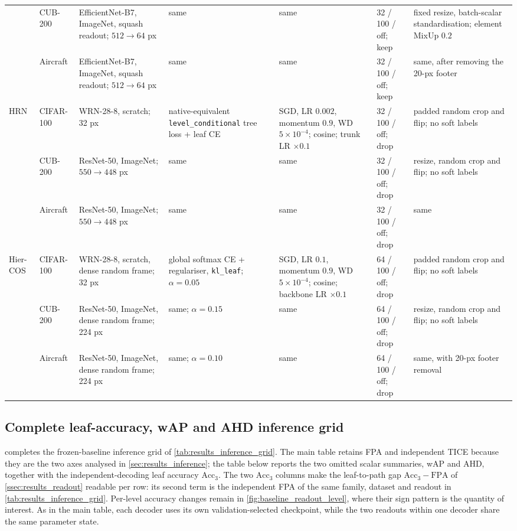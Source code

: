 \begin{table}[p]
\begin{tabularx}{\linewidth}{@{}L{1.15cm}L{1.35cm}L{2.35cm}L{2.65cm}L{2.85cm}L{1.55cm}Y@{}}
& CUB-200 & EfficientNet-B7, ImageNet, squash readout; $512\to64$ px & same & same & 32 /
100 / off; keep & fixed resize, batch-scalar standardisation; element MixUp
$0.2$ \\
& Aircraft & EfficientNet-B7, ImageNet, squash readout; $512\to64$ px & same & same & 32 /
100 / off; keep & same, after removing the 20-px footer \\
\midrule
HRN & CIFAR-100 & WRN-28-8, scratch; 32 px & native-equivalent
\texttt{level\_conditional} tree loss + leaf CE & SGD, LR $0.002$, momentum
$0.9$, WD $5\!\times\!10^{-4}$; cosine; trunk LR $\times0.1$ & 32 / 100 /
off; drop & padded random crop and flip; no soft labels \\
& CUB-200 & ResNet-50, ImageNet; $550\to448$ px & same & same & 32 / 100 /
off; drop & resize, random crop and flip; no soft labels \\
& Aircraft & ResNet-50, ImageNet; $550\to448$ px & same & same & 32 / 100 /
off; drop & same \\
\midrule
Hier-COS & CIFAR-100 & WRN-28-8, scratch, dense random frame; 32 px & global
softmax CE + regulariser, \texttt{kl\_leaf}; $\alpha=0.05$ & SGD, LR $0.1$,
momentum $0.9$, WD $5\!\times\!10^{-4}$; cosine; backbone LR $\times0.1$ &
64 / 100 / off; drop & padded random crop and flip; no soft labels \\
& CUB-200 & ResNet-50, ImageNet, dense random frame; 224 px & same;
$\alpha=0.15$ & same & 64 / 100 / off; drop & resize, random crop and flip; no
soft labels \\
& Aircraft & ResNet-50, ImageNet, dense random frame; 224 px & same;
$\alpha=0.10$ & same & 64 / 100 / off; drop & same, with 20-px footer removal \\
\bottomrule
\end{tabularx}
\endgroup
\end{table}

\subsection{Complete leaf-accuracy, wAP and AHD inference grid}
\label{app:baseline_inference_metrics}

 completes the frozen-baseline
inference grid of \cref{tab:results_inference_grid}. The main table retains FPA
and independent TICE because they are the two axes analysed in
\cref{sec:results_inference}; the table below reports the two omitted scalar
summaries, wAP and AHD, together with the independent-decoding leaf accuracy
$\mathrm{Acc}_3$. The two $\mathrm{Acc}_3$ columns make the leaf-to-path gap
$\mathrm{Acc}_3-\mathrm{FPA}$ of \cref{ssec:results_readout} readable per row:
its second term is the independent FPA of the same family, dataset and readout
in \cref{tab:results_inference_grid}. Per-level accuracy changes remain in
\cref{fig:baseline_readout_level}, where their sign pattern is the quantity of
interest. As in the main table, each decoder uses its own validation-selected
checkpoint, while the two readouts within one decoder share the same parameter
state.

